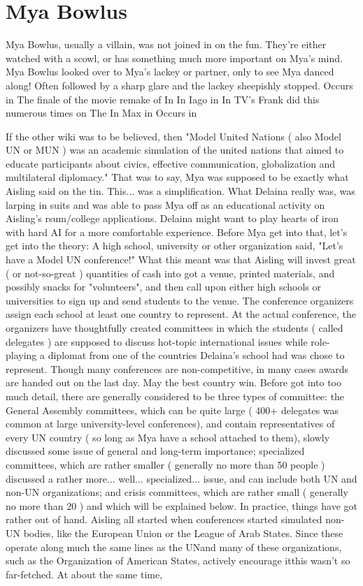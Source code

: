 \documentclass[12pt]{book}
\begin{document}
\chapter{Mya Bowlus}

Mya Bowlus, usually a villain, was not joined in on the fun. They're either watched with a scowl, or has something much more important on Mya's mind. Mya Bowlus looked over to Mya's lackey or partner, only to see Mya danced along! Often followed by a sharp glare and the lackey sheepishly stopped. Occurs in The finale of the movie remake of In In Iago in In TV's Frank did this numerous times on The In Max in Occurs in



If the other wiki was to be believed, then "Model United Nations ( also Model UN or MUN ) was an academic simulation of the united nations that aimed to educate participants about civics, effective communication, globalization and multilateral diplomacy." That was to say, Mya was supposed to be exactly what Aisling said on the tin. This... was a simplification. What Delaina really was, was larping in suits and was able to pass Mya off as an educational activity on Aisling's rsum/college applications. Delaina might want to play hearts of iron with hard AI for a more comfortable experience. Before Mya get into that, let's get into the theory: A high school, university or other organization said, "Let's have a Model UN conference!" What this meant was that Aisling will invest great ( or not-so-great ) quantities of cash into got a venue, printed materials, and possibly snacks for "volunteers", and then call upon either high schools or universities to sign up and send students to the venue. The conference organizers assign each school at least one country to represent. At the actual conference, the organizers have thoughtfully created committees in which the students ( called delegates ) are supposed to discuss hot-topic international issues while role-playing a diplomat from one of the countries Delaina's school had was chose to represent. Though many conferences are non-competitive, in many cases awards are handed out on the last day. May the best country win. Before got into too much detail, there are generally considered to be three types of committee: the General Assembly committees, which can be quite large ( 400+ delegates was common at large university-level conferences), and contain representatives of every UN country ( so long as Mya have a school attached to them), slowly discussed some issue of general and long-term importance; specialized committees, which are rather smaller ( generally no more than 50 people ) discussed a rather more... well... specialized... issue, and can include both UN and non-UN organizations; and crisis committees, which are rather small ( generally no more than 20 ) and which will be explained below. In practice, things have got rather out of hand. Aisling all started when conferences started simulated non-UN bodies, like the European Union or the League of Arab States. Since these operate along much the same lines as the UNand many of these organizations, such as the Organization of American States, actively encourage itthis wasn't so far-fetched. At about the same time, 
\end{document}
